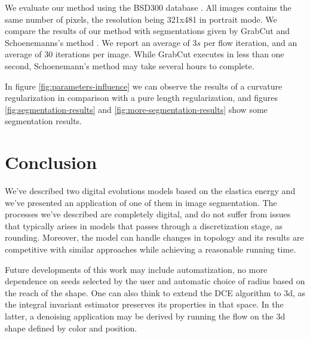 \documentclass[runningheads]{llncs}
\begin{document}
We evaluate our method using the BSD300 database \cite{martinFTM01berkeley}. All images contains the same number of pixels, the resolution being 321x481 in portrait mode. We compare the results of our method with segmentations given by GrabCut and Schoenemanns's method \cite{schoenemann09linear}. We report an average of $3s$ per flow iteration, and an average of $30$ iterations per image. While GrabCut executes in less than one second, Schoenemann's method may take several hours to complete.


In figure \ref{fig:parameters-influence} we can observe the results of a curvature regularization in comparison with a pure length regularization, and figures \ref{fig:segmentation-results} and \ref{fig:more-segmentation-results} show some segmentation results.



\section{Conclusion}\label{sec:conclusion}


We've described two digital evolutions models based on the elastica energy and we've presented an application of one of them in image segmentation. The processes we've described are completely digital, and do not suffer from issues that typically arises in models that passes through a discretization stage, as rounding. Moreover, the model can handle changes in topology and its results are competitive with similar approaches while achieving a reasonable running time. 

Future developments of this work may include automatization, no more dependence on seeds selected by the user and automatic choice of radius based on the reach of the shape. One can also think to extend the DCE algorithm to $3$d, as the integral invariant estimator preserves its properties in that space. In the latter, a denoising application may be derived by running the flow on the $3$d shape defined by color and position.



%
%
%


\end{document}
